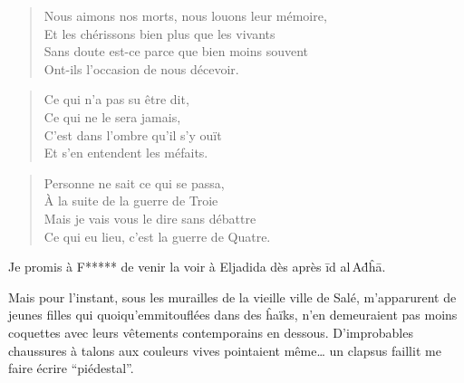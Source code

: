 \begin{verse}\quatrain
  Nous aimons nos morts, nous louons leur mémoire,\\  %
  Et les chérissons bien plus que les vivants\\  %
  Sans doute est-ce parce que bien moins souvent\\  %
  Ont-ils l’occasion de nous décevoir.
\end{verse}

\begin{verse}\quatrain
  Ce qui n’a pas su être dit,\\  %
  Ce qui ne le sera jamais,\\  %
  C’est dans l’ombre qu’il s’y ouït\\  %
  Et s’en entendent les méfaits.
\end{verse}

\begin{verse}\quatrain
  Personne ne sait ce qui se passa,\\  %
  À la suite de la guerre de Troie\\  %
  Mais je vais vous le dire sans  débattre\\  %
  Ce qui eu lieu, c’est la guerre de Quatre.
\end{verse}

\begin{prose}
Je promis à F***** de venir la voir à Eljadida dès après īd al\,Aḋĥā.
\end{prose}

\begin{prose}
  Mais pour l’instant, sous les murailles de la vieille ville de Salé, m’apparurent de jeunes filles qui quoiqu’emmitouflées dans des ĥaïks, n’en demeuraient pas moins coquettes avec leurs vêtements contemporains en dessous. D’improbables chaussures à talons aux couleurs vives pointaient même… un clapsus faillit me faire écrire \enquote{piédestal}.
\end{prose}



